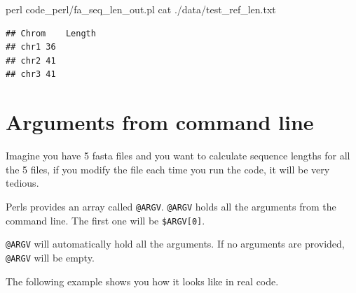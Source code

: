\documentclass[]{book}
\makeatletter
\newenvironment{Shaded}{\begin{snugshade}}{\end{snugshade}}
\newcommand{\KeywordTok}[1]{\textcolor[rgb]{0.13,0.29,0.53}{\textbf{#1}}}
\newcommand{\DataTypeTok}[1]{\textcolor[rgb]{0.13,0.29,0.53}{#1}}
\newcommand{\CharTok}[1]{\textcolor[rgb]{0.31,0.60,0.02}{#1}}
\newcommand{\StringTok}[1]{\textcolor[rgb]{0.31,0.60,0.02}{#1}}
\newcommand{\FunctionTok}[1]{\textcolor[rgb]{0.00,0.00,0.00}{#1}}
\newcommand{\NormalTok}[1]{#1}
\newenvironment{kframe}{%
\medskip{}
\setlength{\fboxsep}{.8em}
 \def\at@end@of@kframe{}%
 \ifinner\ifhmode%
  \def\at@end@of@kframe{\end{minipage}}%
  \begin{minipage}{\columnwidth}%
 \fi\fi%
 \def\FrameCommand##1{\hskip\@totalleftmargin \hskip-\fboxsep
 \colorbox{shadecolor}{##1}\hskip-\fboxsep
     \hskip-\linewidth \hskip-\@totalleftmargin \hskip\columnwidth}%
 \MakeFramed {\advance\hsize-\width
   \@totalleftmargin\z@ \linewidth\hsize
   \@setminipage}}%
 {\par\unskip\endMakeFramed%
 \at@end@of@kframe}
\renewenvironment{Shaded}{\begin{kframe}}{\end{kframe}}
\theoremstyle{definition}
\theoremstyle{definition}
\theoremstyle{definition}
\theoremstyle{remark}
\makeatother
\begin{document}
\begin{Shaded}
\begin{Highlighting}[]
\FunctionTok{perl}\NormalTok{ code_perl/fa_seq_len_out.pl}
\FunctionTok{cat}\NormalTok{ ./data/test_ref_len.txt}
\end{Highlighting}
\end{Shaded}

\begin{verbatim}
## Chrom    Length
## chr1 36
## chr2 41
## chr3 41
\end{verbatim}

\section{Arguments from command line}\label{arguments-from-command-line}

Imagine you have 5 fasta files and you want to calculate sequence
lengths for all the 5 files, if you modify the file each time you run
the code, it will be very tedious.

Perls provides an array called \texttt{@ARGV}. \texttt{@ARGV} holds all
the arguments from the command line. The first one will be
\texttt{\$ARGV{[}0{]}}.

\texttt{@ARGV} will automatically hold all the arguments. If no
arguments are provided, \texttt{@ARGV} will be empty.

The following example shows you how it looks like in real code.

\begin{Shaded}
\end{Shaded}
\end{document}
